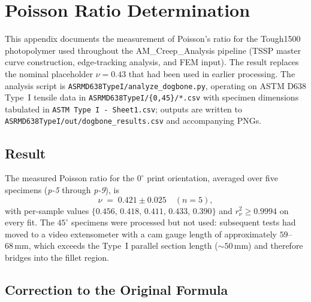 %

\chapter{Poisson Ratio Determination}
\label{app:poisson-ratio}

This appendix documents the measurement of Poisson's ratio for the Tough1500
photopolymer used throughout the AM\_Creep\_Analysis pipeline (TSSP master curve
construction, edge-tracking analysis, and FEM input). The result replaces the
nominal placeholder $\nu = 0.43$ that had been used in earlier processing.
The analysis script is \texttt{ASRMD638TypeI/analyze\_dogbone.py}, operating on
ASTM D638 Type~I tensile data in \texttt{ASRMD638TypeI/\{0,45\}/*.csv} with
specimen dimensions tabulated in \texttt{ASTM~Type~I~-~Sheet1.csv}; outputs are
written to \texttt{ASRMD638TypeI/out/dogbone\_results.csv} and accompanying
PNGs.

\section{Result}
\label{sec:poisson-result}

The measured Poisson ratio for the $0^{\circ}$ print orientation, averaged over
five specimens (\textit{p-5} through \textit{p-9}), is
%
\begin{equation}
  \nu \;=\; 0.421 \pm 0.025 \quad (n = 5),
  \label{eq:poisson-result}
\end{equation}
%
with per-sample values $\{0.456,\,0.418,\,0.411,\,0.433,\,0.390\}$ and
$r^{2}_{\nu} \geq 0.9994$ on every fit. The $45^{\circ}$ specimens were
processed but not used: subsequent tests had moved to a video extensometer with
a cam gauge length of approximately $59$--$68\,\mathrm{mm}$, which exceeds the
Type~I parallel section length ($\sim 50\,\mathrm{mm}$) and therefore bridges
into the fillet region.

\section{Correction to the Original Formula}
\label{sec:poisson-formula}

